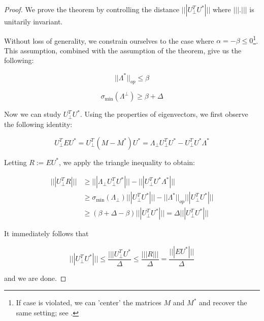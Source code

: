 \documentclass{amsart}
\begin{document}
\begin{proof}

  We prove the theorem by controlling the distance $|||U^{T}_{\perp}U^{*}|||$ where $|||.|||$ is unitarily invariant.

  Without loss of generality, we constrain ourselves to the case where $\alpha = -\beta \leq 0$\footnote{If case is violated, we can 'center' the matrices $M$ and $M^{*}$ and recover the same setting; see \cite{chen_spectral_2021}.}. This assumption, combined with the assumption of the theorem, give us the following:

  $$||\Lambda^{*}||_{op} \leq \beta$$

  $$\sigma_{\min}(\Lambda^{\perp}) \geq \beta + \Delta$$

  Now we can study $U^{T}_{\perp}U^{*}$. Using the properties of eigenvectors, we first observe the following identity:

  $$U^{T}_{\perp}EU^{*} = U^{T}_{\perp}(M - M^{*})U^{*} = \Lambda_{\perp}U^{T}_{\perp}U^{*} - U_{\perp}^{T}U^{*}\Lambda^{*}$$

  Letting $R := EU^{*}$, we apply the triangle inequality to obtain:

 \begin{align*}
   |||U^{T}_{\perp}R||| &\geq |||\Lambda_{\perp}U^{T}_{\perp}U^{*}||| - |||U_{\perp}^{T}U^{*}\Lambda^{*}||| \\
                        &\geq \sigma_{\min}(\Lambda_{\perp})|||U_{\perp}^{T}U^{*}||| - ||\Lambda^{*}||_{op}|||U_{\perp}^{T}U^{*}||| \\
  &\geq (\beta + \Delta - \beta) |||U^{T}_{\perp}U^{*}||| = \Delta |||U^{T}_{\perp}U^{*}|||
 \end{align*}

 It immediately follows that

 $$|||U^{T}_{\perp}U^{*}||| \leq \frac{|||U_{\perp}^{T}U^{*}}{\Delta} \leq \frac{|||R|||}{\Delta} = \frac{|||EU^{*}|||}{\Delta}$$

 and we are done.
\end{proof}




\end{document}
